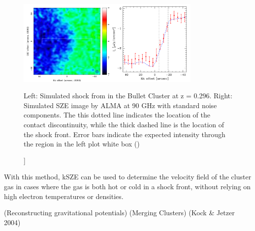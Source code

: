 \documentclass[manuscript]{aastex}
\begin{document}
\begin{figure}[H]
\centering
\captionsetup{width=0.8\textwidth}
\includegraphics[width=0.8\textwidth]{bulletcluster.png}
\caption[ Bullet Cluster Simulated Shock Front kSZE Detection -[\cite{Kitayama2014}]]{Left: Simulated shock from in the Bullet Cluster at z = 0.296. Right: Simulated SZE image by ALMA at 90 GHz with standard noise components. The this dotted line indicates the location of the contact discontinuity, while the thick dashed line is the location of the shock front. Error bars indicate the expected intensity through the region in the left plot white box (\cite{Kitayama2014})}
\label{fig:bulletcluster}
\end{figure}
With this method, kSZE can be used to determine the velocity field of the cluster gas in cases where the gas is both hot or cold in a shock front, without relying on high electron temperatures or densities. 



(Reconstructing gravitational potentials)
(Merging Clusters) 
   (Kock \& Jetzer 2004)
    
\end{document}
